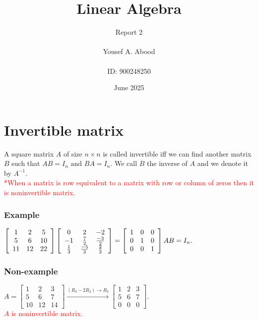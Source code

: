 \documentclass[a4paper,12pt]{article}
\title{Linear Algebra}
\author{Report 2\\ \\ Yousef A. Abood\\ \\ ID: 900248250}
\date{June 2025}
\begin{document}
\maketitle
\noindent\makebox[\linewidth]{\rule{15cm}{0.4pt}}
\section{Invertible matrix}
A square matrix $A$ of size $n \times n$ is called invertible iff we can find another matrix $B$ such that $AB=I_{n} \text{ and } BA=I_{n}.$ We call $B$ the inverse of $A$ and we denote it by $A^{-1}.$
\\ \textcolor{red}{*When a matrix is row equivalent to a matrix with row or column of zeros then it is noninvertible matrix.}
\subsubsection*{Example}
$\left [ \begin{array}{ccc}
        1&2&5\\
        5&6&10\\
        11&12&22
    \end{array}\right ]\left [ \begin{array}{ccc}
        0&2&-2\\
        -1&\frac{7}{2}&\frac{-3}{2}\\
        \frac{1}{3}&\frac{-5}{3}&\frac{2}{3}
    \end{array}\right ]=\left [ \begin{array}{ccc}
        1&0&0\\
        0&1&0\\
        0&0&1
    \end{array}\right ] \\ \\ AB=I_{n}.$
    \subsubsection*{Non-example}
    $A=\left [ \begin{array}{ccc}
        1&2&3\\
        5&6&7\\
        10&12&14
    \end{array}\right ] \xrightarrow{{(R_3-2R_2)}\to{R_3}}\left [ \begin{array}{ccc}
        1&2&3\\
        5&6&7\\
        0&0&0
    \end{array}\right ].$\\
    \textcolor{red}{$A$ is noninvertible matrix.}
\end{document}
